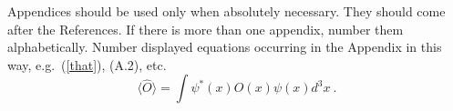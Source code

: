 \documentclass[twoside]{article}
\begin{document}
\appendix

\noindent
Appendices should be used only when absolutely necessary. They
should come after the References. If there is more than one
appendix, number them alphabetically. Number displayed equations
occurring in the Appendix in this way, e.g.~(\ref{that}), (A.2),
etc.
\begin{equation}
\langle\hat{O}\rangle=\int\psi^*(x)O(x)\psi(x)d^3x~. 
\label{that}
\end{equation}
\end{document}
